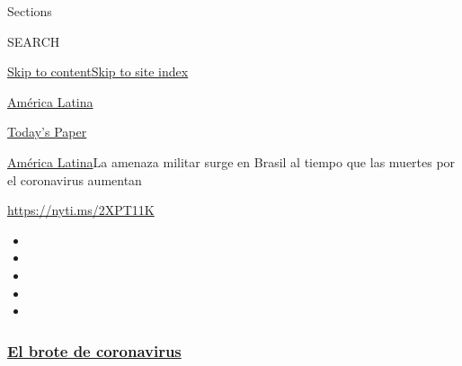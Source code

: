 Sections

SEARCH

\protect\hyperlink{site-content}{Skip to
content}\protect\hyperlink{site-index}{Skip to site index}

\href{https://www.nytimes3xbfgragh.onion/es/section/america-latina}{América
Latina}

\href{https://myaccount.nytimes3xbfgragh.onion/auth/login?response_type=cookie\&client_id=vi}{}

\href{https://www.nytimes3xbfgragh.onion/section/todayspaper}{Today's
Paper}

\href{/es/section/america-latina}{América Latina}\textbar{}La amenaza
militar surge en Brasil al tiempo que las muertes por el coronavirus
aumentan

\url{https://nyti.ms/2XPT11K}

\begin{itemize}
\item
\item
\item
\item
\item
\end{itemize}

\hypertarget{el-brote-de-coronavirus}{%
\subsubsection{\texorpdfstring{\href{https://www.nytimes3xbfgragh.onion/es/spotlight/coronavirus?name=styln-coronavirus-es\&region=TOP_BANNER\&block=storyline_menu_recirc\&action=click\&pgtype=Article\&impression_id=81886f60-f4bd-11ea-b05b-4ba005ac198e\&variant=undefined}{El
brote de
coronavirus}}{El brote de coronavirus}}\label{el-brote-de-coronavirus}}

